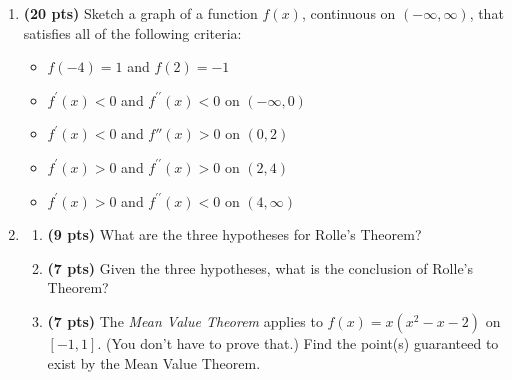 \documentclass[12pt]{article}
\begin{document}
\newpage
\begin{enumerate}

%
\item {\bf (20 pts)} Sketch a graph of a function $f(x)$, continuous on $(-\infty,\infty)$, that satisfies all of the following criteria:
\begin{itemize}
\item $f(-4)=1$ and $f(2)=-1$
\item $f^{\prime}(x)<0$ and $f^{\prime\prime}(x)<0$ on $(-\infty,0)$
\item $f^{\prime}(x)<0$ and $f''(x)>0$ on $(0,2)$
\item $f^{\prime}(x)>0$ and $f^{\prime\prime}(x)>0$ on $(2,4)$
\item $f^{\prime}(x)>0$ and $f^{\prime\prime}(x)<0$ on $(4,\infty)$
\end{itemize}

\newpage
\item \begin{enumerate}
	\item {\bf (9 pts)} What are the three hypotheses for Rolle's Theorem?
	\vspace{9pc}
	
	\item {\bf (7 pts)} Given the three hypotheses, what is the conclusion of Rolle's Theorem?
	\vspace{7pc}
	
	\item {\bf (7 pts)} The \emph{Mean Value Theorem} applies to 
	$f(x)=x(x^2-x-2)$ %
	on $[-1,1]$.  (You don't have to prove that.)  Find the point(s) guaranteed to exist by the Mean Value Theorem.   
	\end{enumerate}


\end{enumerate}
\end{document}
